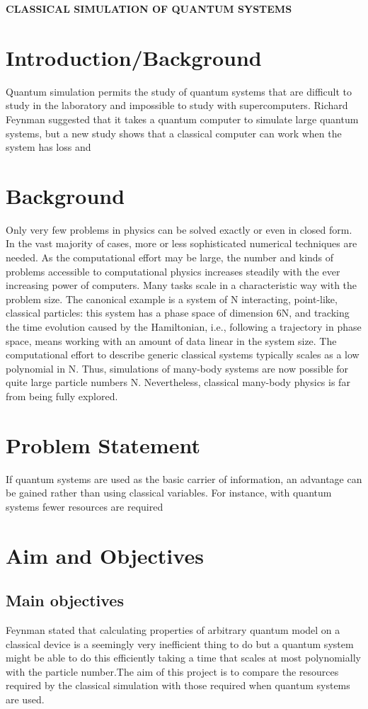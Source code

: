 \documentclass[options]{article}
\begin{document}
\textbf{CLASSICAL SIMULATION OF QUANTUM SYSTEMS}

\section{\textbf{ Introduction/Background}}
Quantum simulation permits the study of quantum systems that are difficult to study in the laboratory and impossible to study with supercomputers.
Richard Feynman suggested that it takes a quantum computer to simulate large quantum systems, but a new study shows that a classical computer can work when the system has loss and 


\section{\textbf{ Background }}
Only very few problems in physics can be solved exactly or even in closed form. In the vast majority of cases, more or less sophisticated numerical techniques are needed. As the computational effort may be large, the number and kinds of problems accessible to computational physics increases steadily with the ever increasing power of computers. Many tasks scale in a characteristic way with the problem size. The canonical example is a system of N interacting, point-like, classical particles: this system has a phase space of dimension 6N, and tracking the time evolution caused by the Hamiltonian, i.e., following a trajectory in phase space, means working with an amount of data linear in the system size. The computational effort to describe generic classical systems typically scales as a low polynomial in N. Thus, simulations of many-body systems are now possible for quite large particle numbers N. Nevertheless, classical many-body physics is far from being fully explored.

\section{\textbf{ Problem Statement}}
If quantum systems are used as the basic carrier of information, an advantage can be gained rather than using classical variables. For instance, with quantum systems fewer resources are required

\section{\textbf{ Aim and Objectives}}

\subsection{Main objectives}
Feynman stated that calculating properties of arbitrary quantum model on a classical device is a seemingly very inefficient thing to do but a quantum system might be able to do this efficiently taking a time that scales at most polynomially with the particle number.The aim of this project is to compare the resources required by the classical simulation with those required when quantum systems are used.
\end{document}
